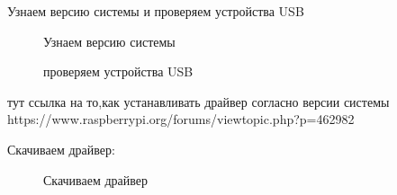 

Узнаем версию системы и проверяем устройства USB

\begin{figure}[h!]
\caption{ Узнаем версию системы }
\label{driver_1:driver_1}
\end{figure}


\begin{figure}[h!]
\caption{ проверяем устройства USB }
\label{driver_2:driver_2}
\end{figure}


тут ссылка на то,как устанавливать драйвер согласно версии системы
https://www.raspberrypi.org/forums/viewtopic.php?p=462982

Скачиваем драйвер:

\begin{figure}[h!]
\caption{ Скачиваем драйвер }
\label{driver_3:driver_3}
\end{figure}









